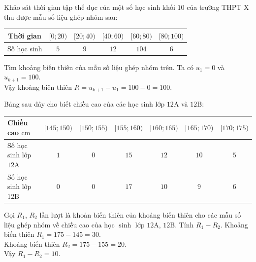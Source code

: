 \begin{bt}%
	Khảo sát thời gian tập thể dục của một số học sinh khối $10$ của trường THPT X thu được mẫu số liệu ghép nhóm sau:
	\begin{center}
		\begin{tabular}{|c|c|c|c|c|c|}
			\hline Thời gian & $[0 ; 20)$ & $[20 ; 40)$ & $[40 ; 60)$ & $[60 ; 80)$ & $[80 ; 100)$ \\
			\hline Số học sinh & $5$ & $9$ & $12$ & $104$ & $6$ \\
			\hline
		\end{tabular}
	\end{center}
	Tìm khoảng biến thiên của mẫu số liệu ghép nhóm trên.
	\loigiai
	{
		Ta có $u_1=0$ và $u_{k+1}=100$.\\
		Vậy khoảng biên thiên $R=u_{k+1}-u_1=100-0=100$.
	}
\end{bt}

\begin{bt}%
	Bảng sau đây cho biết chiều cao của các học sinh lớp $12\mathrm{A}$ và $12\mathrm{B}$:
	\begin{center}
		\begin{tabular}{|l|c|c|c|c|c|c|}
			\hline 
			Chiều cao $\mathrm{cm}$ & $[145 ; 150)$ & $[150 ; 155)$ & $[155 ; 160)$ & $[160 ; 165)$ & $[165 ; 170)$ & $[170 ; 175)$ \\
			\hline 
			Số học sinh lớp $12\mathrm{A}$ & $1$ & $0$ & $15$ & $12$ & $10$ & $5$ \\
			\hline 
			Số học sinh lớp $12\mathrm{B}$ & $0$ & $0$ & $17$ & $10$ & $9$ & $6$ \\
			\hline
		\end{tabular}
	\end{center}
	Gọi $R_1$, $R_2$ lần lượt là khoản biến thiên của khoảng biến thiên cho các mẫu số liệu ghép nhóm về chiều cao của học $\sinh$ lớp $12\mathrm{A}$, $12\mathrm{B}$. Tính $R_1-R_2$.
	\loigiai
	{
		Khoảng biến thiên $R_1=175-145=30$.\\
		Khoảng biến thiên $R_2=175-155=20$.\\
		Vậy $R_1-R_2=10$.
	}
\end{bt}

